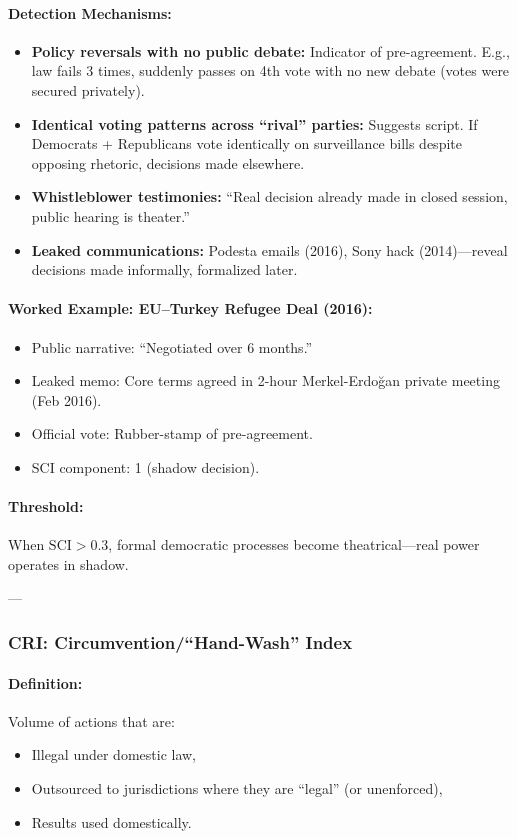 \documentclass[11pt,a4paper]{article}
\theoremstyle{definition}
\theoremstyle{remark}
\begin{document}
\paragraph{Detection Mechanisms:}
\begin{itemize}
\item \textbf{Policy reversals with no public debate:} Indicator of pre-agreement. E.g., law fails 3 times, suddenly passes on 4th vote with no new debate (votes were secured privately).
\item \textbf{Identical voting patterns across ``rival'' parties:} Suggests script. If Democrats + Republicans vote identically on surveillance bills despite opposing rhetoric, decisions made elsewhere.
\item \textbf{Whistleblower testimonies:} ``Real decision already made in closed session, public hearing is theater.''
\item \textbf{Leaked communications:} Podesta emails (2016), Sony hack (2014)—reveal decisions made informally, formalized later.
\end{itemize}

\paragraph{Worked Example: EU–Turkey Refugee Deal (2016):}
\begin{itemize}
\item Public narrative: ``Negotiated over 6 months.''
\item Leaked memo: Core terms agreed in 2-hour Merkel-Erdoğan private meeting (Feb 2016).
\item Official vote: Rubber-stamp of pre-agreement.
\item SCI component: 1 (shadow decision).
\end{itemize}

\paragraph{Threshold:}
When $\text{SCI} > 0.3$, formal democratic processes become theatrical—real power operates in shadow.

---

\subsubsection{CRI: Circumvention/``Hand-Wash'' Index}

\paragraph{Definition:}
Volume of actions that are:
\begin{itemize}
\item Illegal under domestic law,
\item Outsourced to jurisdictions where they are ``legal'' (or unenforced),
\item Results used domestically.
\end{itemize}
\end{document}
